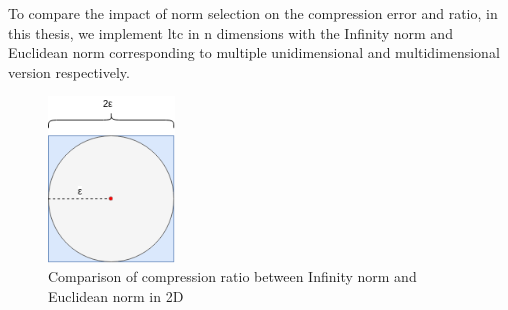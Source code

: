 To compare the impact of norm selection on the compression error and ratio, in
this thesis, we implement \acrshort{ltc} in n dimensions with the Infinity norm
and Euclidean norm corresponding to multiple unidimensional and multidimensional
version respectively. 


\begin{figure}
    \centering
    \includegraphics[width=0.3\textwidth]{figures/2D_Comparison.png}
    \caption{Comparison of compression ratio between Infinity norm and Euclidean norm in 2D}
    \label{fig:norm-comparison-2D}
\end{figure}
